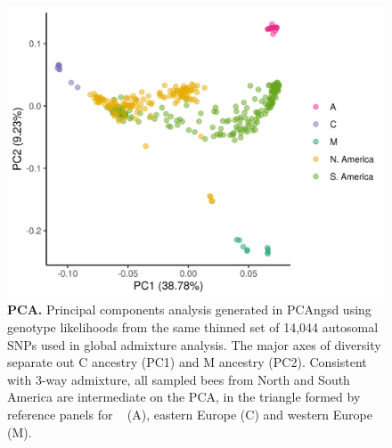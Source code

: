 \begin{figure}[ht]
\includegraphics[width=\textwidth]{chapter1/figures/PCA_12_combined_sept19_byGroup.png}

\caption{ \textbf{PCA.} Principal components analysis generated in PCAngsd using genotype likelihoods from the same thinned set of 14,044 autosomal SNPs used in global admixture analysis. The major axes of diversity separate out C ancestry (PC1) and M ancestry (PC2). Consistent with 3-way admixture, all sampled bees from North and South America are intermediate on the PCA, in the triangle formed by reference panels for  \scutellata\  (A),  eastern Europe (C) and  western Europe (M).}

\label{supp_pca}
\end{figure}

